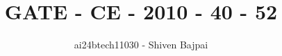 \documentclass[journal]{IEEEtran}
\begin{document}
\onecolumn

\vspace{3cm}

\renewcommand{\thefigure}{\theenumi}
\renewcommand{\thetable}{\theenumi}

\title{GATE - CE - 2010 - 40 - 52}
\author{ai24btech11030 - Shiven Bajpai}
\maketitle

\iffalse
\begin{multicols}{4}
\begin{enumerate}
    \item 
    \item 
    \item 
    \item 
\end{enumerate}
\end{multicols}
\fi
\end{document}
